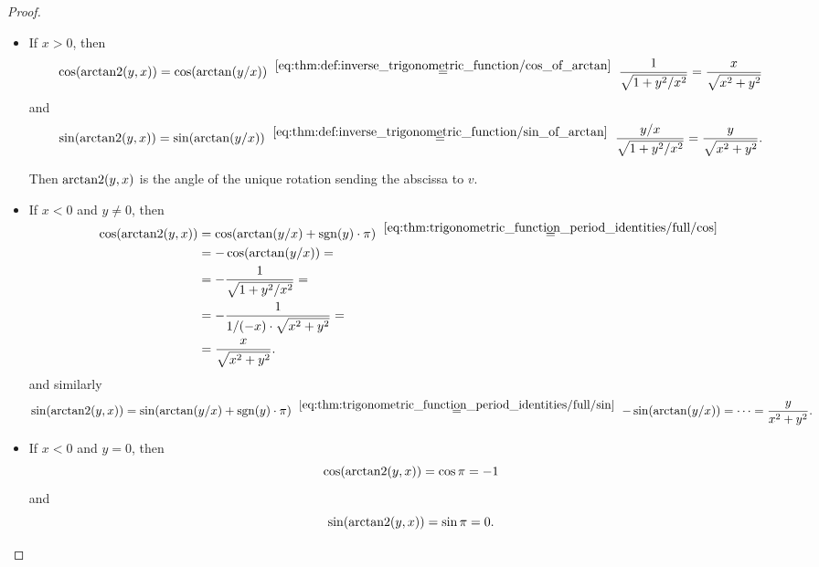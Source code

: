 \begin{proof}
  \hfill
  \begin{itemize}
    \item If \( x > 0 \), then
    \begin{equation*}
      \cos(\arctantwo(y, x))
      =
      \cos(\arctan(\ifrac y x))
      \reloset {\eqref{eq:thm:def:inverse_trigonometric_function/cos_of_arctan}} =
      \frac 1 {\sqrt{1 + \ifrac {y^2} {x^2}}}
      =
      \frac x {\sqrt{x^2 + y^2}}
    \end{equation*}
    and
    \begin{equation*}
      \sin(\arctantwo(y, x))
      =
      \sin(\arctan(\ifrac y x))
      \reloset {\eqref{eq:thm:def:inverse_trigonometric_function/sin_of_arctan}} =
      \frac {\ifrac y x} {\sqrt{1 + \ifrac {y^2} {x^2}}}
      =
      \frac y {\sqrt{x^2 + y^2}}.
    \end{equation*}

    Then \( \operatorname{arctan2}(y, x) \) is the angle of the unique rotation sending the abscissa to \( v \).

    \item If \( x < 0 \) and \( y \neq 0 \), then
    \begin{align*}
      \cos(\arctantwo(y, x))
      &=
      \cos(\arctan(\ifrac y x) + \sgn(y) \cdot \pi)
      \reloset {\eqref{eq:thm:trigonometric_function_period_identities/full/cos}} = \\ &=
      -\cos(\arctan(\ifrac y x))
      = \\ &=
      -\frac 1 {\sqrt{1 + \ifrac {y^2} {x^2}}}
      = \\ &=
      -\frac 1 {\ifrac 1 {(-x)} \cdot \sqrt{x^2 + y^2}}
      = \\ &=
      \frac x {\sqrt{x^2 + y^2}}.
    \end{align*}
    and similarly
    \begin{equation*}
      \sin(\arctantwo(y, x))
      =
      \sin(\arctan(\ifrac y x)  + \sgn(y) \cdot \pi)
      \reloset {\eqref{eq:thm:trigonometric_function_period_identities/full/sin}} =
      -\sin(\arctan(\ifrac y x))
      =
      \cdots
      =
      \frac y {x^2 + y^2}.
    \end{equation*}

    \item If \( x < 0 \) and \( y = 0 \), then
    \begin{equation*}
      \cos(\operatorname{arctan2}(y, x)) = \cos \pi = -1
    \end{equation*}
    and
    \begin{equation*}
      \sin(\operatorname{arctan2}(y, x)) = \sin \pi = 0.
    \end{equation*}


\end{itemize}
\end{proof}

